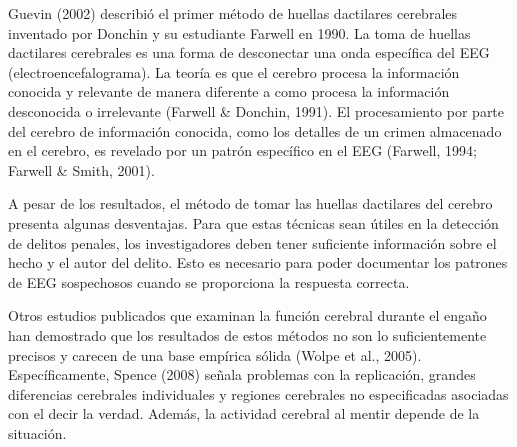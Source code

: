 Guevin (2002) describió el primer método de huellas dactilares cerebrales inventado por Donchin y su estudiante Farwell en 1990. La toma de huellas dactilares cerebrales es una forma de desconectar una onda específica del EEG (electroencefalograma). La teoría es que el cerebro procesa la información conocida y relevante de manera diferente a como procesa la información desconocida o irrelevante (Farwell \& Donchin, 1991). El procesamiento por parte del cerebro de información conocida, como los detalles de un crimen almacenado en el cerebro, es revelado por un patrón específico en el EEG (Farwell, 1994; Farwell \& Smith, 2001).

A pesar de los resultados, el método de tomar las huellas dactilares del cerebro presenta algunas desventajas. Para que estas técnicas sean útiles en la detección de delitos penales, los investigadores deben tener suficiente información sobre el hecho y el autor del delito. Esto es necesario para poder documentar los patrones de EEG sospechosos cuando se proporciona la respuesta correcta.

Otros estudios publicados que examinan la función cerebral durante el engaño han demostrado que los resultados de estos métodos no son lo suficientemente precisos y carecen de una base empírica sólida (Wolpe et al., 2005). Específicamente, Spence (2008) señala problemas con la replicación, grandes diferencias cerebrales individuales y regiones cerebrales no especificadas asociadas con el decir la verdad. Además, la actividad cerebral al mentir depende de la situación. 

